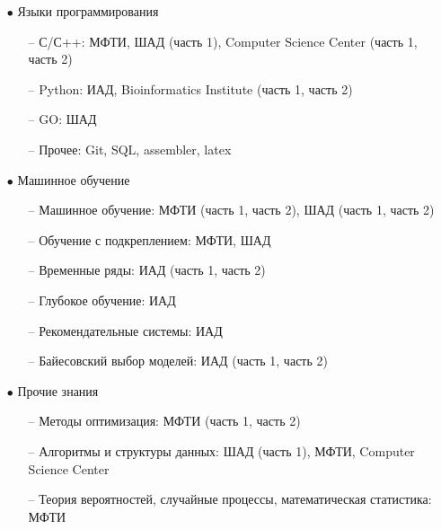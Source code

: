 \documentclass[a4paper,12pt]{article}
\begin{document}
    \begin{enumerate}

        \item[$\bullet$] Языки программирования

            \begin{enumerate}

                \item[--] С/С++: МФТИ, ШАД (часть 1), Computer Science Center (часть 1, часть 2)

                \item[--] Python: ИАД, Bioinformatics Institute (часть 1, часть 2)

                \item[--] GO: ШАД
                
                \item[--] Прочее: Git, SQL, assembler, latex

            \end{enumerate}

        \item[$\bullet$] Машинное обучение

            \begin{enumerate}

                \item[--] Машинное обучение: МФТИ (часть 1, часть 2), ШАД (часть 1, часть 2)

                \item[--] Обучение с подкреплением: МФТИ, ШАД

                \item[--] Временные ряды: ИАД (часть 1, часть 2)

                \item[--] Глубокое обучение: ИАД

                \item[--] Рекомендательные системы: ИАД

                \item[--] Байесовский выбор моделей: ИАД (часть 1, часть 2)

            \end{enumerate}

        \item[$\bullet$] Прочие знания

            \begin{enumerate}

                \item[--] Методы оптимизация: МФТИ (часть 1, часть 2)

                \item[--] Алгоритмы и структуры данных: ШАД (часть 1), МФТИ, Computer Science Center

                \item[--] Теория вероятностей, случайные процессы, математическая статистика: МФТИ

            \end{enumerate}

    \end{enumerate}
\end{document}
